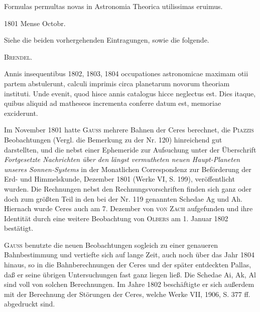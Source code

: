 \clearpage{}
\noindent\hspace*{\parindent}Formulas permultas novas in Astronomia Theorica utilissimas eruimus.
\par\noindent\hfill 1801 Mense Octobr.
\par\medskip\begingroup\small
\noindent\hspace*{\parindent}Siehe die beiden vorhergehenden Eintragungen, sowie die folgende.
\par\noindent\hfill\textsc{Brendel.}
\par\endgroup

\noindent\hspace*{\parindent}Annis insequentibus 1802, 1803, 1804 occupationes astronomicae maximam otii partem abstulerunt, calculi imprimis circa planetarum novorum theoriam instituti. Unde evenit, quod hisce annis catalogus hicce neglectus est. Dies itaque, quibus aliquid ad matheseos incrementa conferre datum est, memoriae exciderunt.
\par\medskip\begingroup\small
\noindent\hspace*{\parindent}Im November 1801 hatte \textsc{Gauss} mehrere Bahnen der Ceres berechnet, die \textsc{Piazzis} Beobachtungen (Vergl. die Bemerkung zu der Nr. 120) hinreichend gut darstellten, und die nebst einer Ephemeride zur Aufsuchung unter der Überschrift \textit{Fortgesetzte Nachrichten über den längst vermutheten neuen Haupt-Planeten unseres Sonnen-Systems} in der Monatlichen Correspondenz zur Beförderung der Erd- und Himmelskunde, Dezember 1801 (Werke VI, S. 199), veröffentlicht wurden. Die Rechnungen nebst den Rechnungsvorschriften finden sich ganz oder doch zum größten Teil in den bei der Nr. 119 genannten Schedae Ag und Ah. Hiernach wurde Ceres auch am 7. Dezember von \textsc{von Zach} aufgefunden und ihre Identität durch eine weitere Beobachtung von \textsc{Olbers} am 1. Januar 1802 bestätigt.
\par\noindent\hspace*{\parindent}\textsc{Gauss} benutzte die neuen Beobachtungen sogleich zu einer genaueren Bahnbestimmung und vertiefte sich auf lange Zeit, auch noch über das Jahr 1804 hinaus, so in die Bahnberechnungen der Ceres und der später entdeckten Pallas, daß er seine übrigen Untersuchungen fast ganz liegen ließ. Die Schedae Ai, Ak, Al sind voll von solchen Berechnungen. Im Jahre 1802 beschäftigte er sich außerdem mit der Berechnung der Störungen der Ceres, welche Werke VII, 1906, S. 377 ff. abgedruckt sind.
